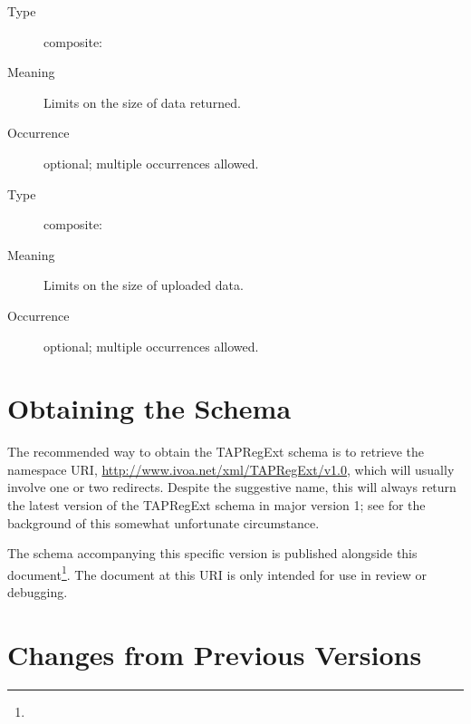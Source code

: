 \documentclass{ivoa}
\begin{document}
\begin{generated}
\begin{bigdescription}
\begin{description}
\end{description}
\item[Element \xmlel{outputLimit}]
\begin{description}
\item[Type] composite: 
\item[Meaning] Limits on the size of data returned.
\item[Occurrence] optional; multiple occurrences allowed.

\end{description}
\item[Element \xmlel{uploadLimit}]
\begin{description}
\item[Type] composite: 
\item[Meaning] Limits on the size of uploaded data.
\item[Occurrence] optional; multiple occurrences allowed.

\end{description}


\end{bigdescription}\endgroup

\endgroup
\end{generated}


\appendix


\section{Obtaining the Schema}

\label{app:fullschema}

The recommended way to obtain the TAPRegExt schema is to retrieve the
namespace URI, \url{http://www.ivoa.net/xml/TAPRegExt/v1.0}, which will
usually involve one or two redirects.  Despite the suggestive name, this
will always return the latest version of the TAPRegExt schema in major
version 1; see \citet{2018ivoa.spec.0529H} for the background of this
somewhat unfortunate circumstance.

The schema accompanying this specific version is published alongside this
document\footnote{}.  The document at
this URI is only intended for use in review or debugging.

\section{Changes from Previous Versions}
\end{document}
